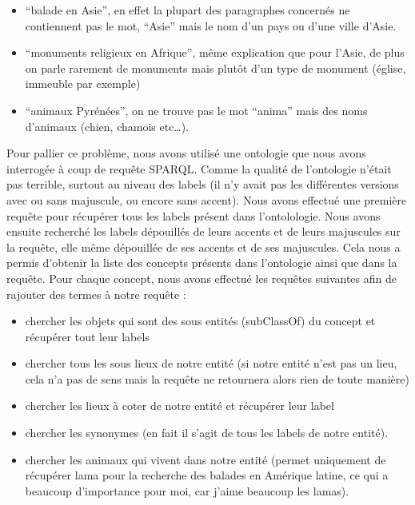\documentclass{article}
\begin{document}
\begin{itemize}

    \item “balade en Asie”, en effet la plupart des paragraphes concernés ne
        contiennent pas le mot, “Asie” mais le nom d’un pays ou d’une ville d’Asie.

    \item “monuments religieux en Afrique”, même explication que pour l’Asie, de plus
        on parle rarement de monuments mais plutôt d’un type de monument (église,
        immeuble par exemple)

    \item “animaux Pyrénées”, on ne trouve pas le mot “anima” mais des noms d’animaux
        (chien, chamois etc…).

\end{itemize}


Pour pallier ce problème, nous avons utilisé une ontologie que nous avons interrogée
à coup de requête SPARQL. Comme la qualité de l’ontologie n’était pas terrible,
surtout au niveau des labels (il n’y avait pas les différentes versions avec ou sans
majuscule, ou encore sans accent). Nous avons effectué une première requête pour
récupérer tous les labels présent dans l’ontolologie. Nous avons ensuite recherché
les labels dépouillés de leurs accents et de leurs majuscules sur la requête, elle
même dépouillée de ses accents et de ses majuscules. Cela nous a permis d’obtenir la
liste des concepts présents dans l’ontologie ainsi que dans la requête. Pour chaque
concept, nous avons effectué les requêtes suivantes afin de rajouter des termes
à notre requête :

\begin{itemize}

    \item chercher les objets qui sont des sous entités (subClassOf) du concept et
        récupérer tout leur labels

    \item chercher tous les sous lieux de notre entité (si notre entité n’est pas un
        lieu, cela n’a pas de sens mais la requête ne retournera alors rien de toute
        manière)

    \item chercher les lieux à coter de notre entité et récupérer leur label

    \item chercher les synonymes (en fait il s’agit de tous les labels de notre
        entité).

    \item chercher les animaux qui vivent dans notre entité (permet uniquement de
        récupérer lama pour la recherche des balades en Amérique latine, ce qui
        a beaucoup d’importance pour moi, car j’aime beaucoup les lamas).

\end{itemize}
\end{document}
